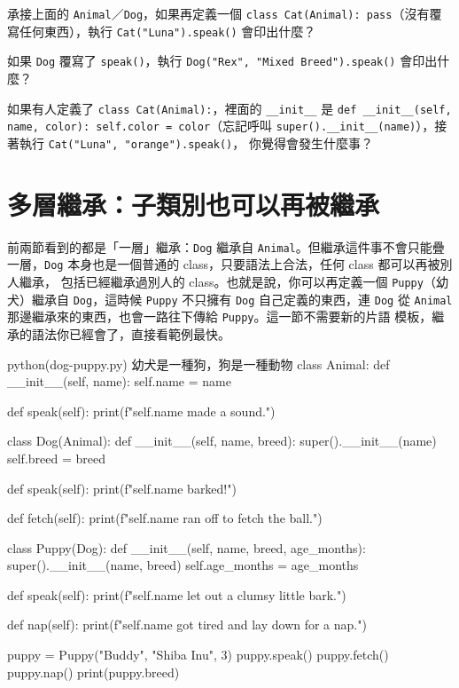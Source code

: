 \begin{drills}[label=drills:inheritance-basics]
\item 承接上面的 \texttt{Animal}／\texttt{Dog}，如果再定義一個
\texttt{class Cat(Animal): pass}（沒有覆寫任何東西），執行
\texttt{Cat("Luna").speak()} 會印出什麼？
\item 如果 \texttt{Dog} 覆寫了 \texttt{speak()}，執行
\texttt{Dog("Rex", "Mixed Breed").speak()} 會印出什麼？
\item 如果有人定義了 \texttt{class Cat(Animal):}，裡面的 \texttt{\_\_init\_\_} 是
\texttt{def \_\_init\_\_(self, name, color): self.color = color}（忘記呼叫
\texttt{super().\_\_init\_\_(name)}），接著執行 \texttt{Cat("Luna", "orange").speak()}，
你覺得會發生什麼事？
\end{drills}

\section{多層繼承：子類別也可以再被繼承}
\label{sec:multi-level-inheritance}

前兩節看到的都是「一層」繼承：\texttt{Dog} 繼承自 \texttt{Animal}。但繼承這件事不會只能疊
一層，\texttt{Dog} 本身也是一個普通的 class，只要語法上合法，任何 class 都可以再被別人繼承，
包括已經繼承過別人的 class。也就是說，你可以再定義一個 \texttt{Puppy}（幼犬）繼承自
\texttt{Dog}，這時候 \texttt{Puppy} 不只擁有 \texttt{Dog} 自己定義的東西，連 \texttt{Dog}
從 \texttt{Animal} 那邊繼承來的東西，也會一路往下傳給 \texttt{Puppy}。這一節不需要新的片語
模板，繼承的語法你已經會了，直接看範例最快。

\begin{example}{python}{(dog-puppy.py) 幼犬是一種狗，狗是一種動物}
class Animal:
    def __init__(self, name):
        self.name = name

    def speak(self):
        print(f"{self.name} made a sound.")


class Dog(Animal):
    def __init__(self, name, breed):
        super().__init__(name)
        self.breed = breed

    def speak(self):
        print(f"{self.name} barked!")

    def fetch(self):
        print(f"{self.name} ran off to fetch the ball.")


class Puppy(Dog):
    def __init__(self, name, breed, age_months):
        super().__init__(name, breed)
        self.age_months = age_months

    def speak(self):
        print(f"{self.name} let out a clumsy little bark.")

    def nap(self):
        print(f"{self.name} got tired and lay down for a nap.")


puppy = Puppy("Buddy", "Shiba Inu", 3)
puppy.speak()
puppy.fetch()
puppy.nap()
print(puppy.breed)
\end{example}

